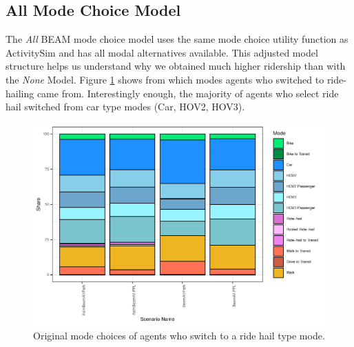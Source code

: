 \documentclass[fancy, masters]{byuthesis}
\begin{document}
\begin{table}

\caption{\label{tab:noneloss}Loss of Ride-hailing trips in the None Mode Choice Model.}
\centering
{}
\end{table}

\hypertarget{type3}{%
\subsection{All Mode Choice Model}\label{type3}}

The \emph{All} BEAM mode choice model uses the same mode choice utility function as ActivitySim and has all modal alternatives available. This adjusted model structure helps us understand why we obtained much higher ridership than with the \emph{None} Model. Figure \ref{fig:piechart} shows from which modes agents who switched to ride-hailing came from. Interestingly enough, the majority of agents who select ride hail switched from car type modes (Car, HOV2, HOV3).

\begin{figure}

{\centering \includegraphics{thesis_files/figure-latex/piechart-1} 

}

\caption{Original mode choices of agents who switch to a ride hail type mode.}\label{fig:piechart}
\end{figure}
\end{document}
